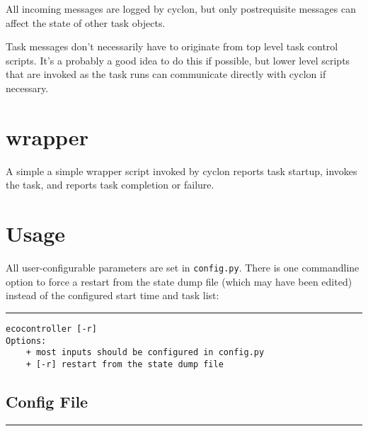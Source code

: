 \documentclass[11pt,a4paper]{article}
\begin{document}
All incoming messages are logged by cyclon, but only postrequisite
messages can affect the state of other task objects.

Task messages don't necessarily have to originate from top level task
control scripts. It's a probably a good idea to do this if possible, but
lower level scripts that are invoked as the task runs can communicate
directly with cyclon if necessary.

\section{wrapper}

A simple a simple wrapper script invoked by cyclon reports task
startup, invokes the task, and reports task completion or failure. 


\label{usage}
\section{Usage}

All user-configurable parameters are set in \verb#config.py#. There is
one commandline option to force a restart from the state dump file
(which may have been edited) instead of the configured start time and
task list:

\lstset{language=sh}

{\small

\noindent
\rule{5cm}{.2mm}
\begin{lstlisting}
ecocontroller [-r]
Options:
    + most inputs should be configured in config.py
    + [-r] restart from the state dump file
\end{lstlisting}
}

\lstset{language=Python}

\subsection{Config File}

{\small
\noindent
\rule{5cm}{.2mm}

}
\end{document}
